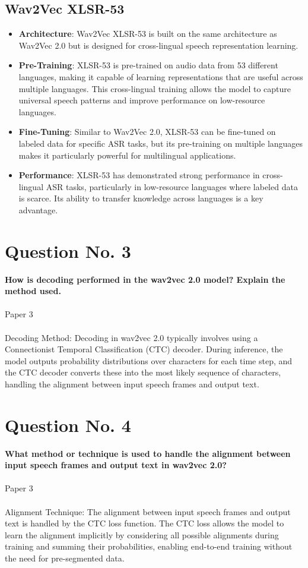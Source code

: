 \documentclass{article}
\begin{document}
\subsection*{Wav2Vec XLSR-53}
\begin{itemize}
  \item \textbf{Architecture}: Wav2Vec XLSR-53 is built on the same architecture as Wav2Vec 2.0 but is designed for cross-lingual speech representation learning.
  \item \textbf{Pre-Training}: XLSR-53 is pre-trained on audio data from 53 different languages, making it capable of learning representations that are useful across multiple languages. This cross-lingual training allows the model to capture universal speech patterns and improve performance on low-resource languages.
  \item \textbf{Fine-Tuning}: Similar to Wav2Vec 2.0, XLSR-53 can be fine-tuned on labeled data for specific ASR tasks, but its pre-training on multiple languages makes it particularly powerful for multilingual applications.
  \item \textbf{Performance}: XLSR-53 has demonstrated strong performance in cross-lingual ASR tasks, particularly in low-resource languages where labeled data is scarce. Its ability to transfer knowledge across languages is a key advantage.
\end{itemize}


\pagebreak

\section*{Question No. 3}
\textbf{How is decoding performed in the wav2vec 2.0 model? Explain the method used.}\\\\
Paper 3\\\\
Decoding Method: Decoding in wav2vec 2.0 typically involves using a Connectionist Temporal Classification (CTC) decoder. During inference, the model outputs probability distributions over characters for each time step, and the CTC decoder converts these into the most likely sequence of characters, handling the alignment between input speech frames and output text.

\pagebreak

\section*{Question No. 4}
\textbf{What method or technique is used to handle the alignment between input speech frames and output text in wav2vec 2.0?}\\\\
Paper 3\\\\
Alignment Technique: The alignment between input speech frames and output text is handled by the CTC loss function. The CTC loss allows the model to learn the alignment implicitly by considering all possible alignments during training and summing their probabilities, enabling end-to-end training without the need for pre-segmented data.
\end{document}
